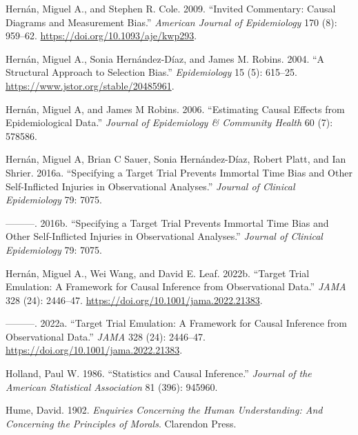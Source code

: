 \documentclass[
  singlecolumn]{article}
\newlength{\cslhangindent}
\newlength{\cslentryspacingunit} %
\newenvironment{CSLReferences}[2] %
 {%
  \setlength{\parindent}{0pt}
  \ifodd #1
  \let\oldpar\par
  \def\par{\hangindent=\cslhangindent\oldpar}
  \fi
  \setlength{\parskip}{#2\cslentryspacingunit}
 }%
 {}
\begin{document}
\begin{CSLReferences}{1}{0}
\leavevmode{}%
Hernán, Miguel A., and Stephen R. Cole. 2009. {``Invited Commentary:
Causal Diagrams and Measurement Bias.''} \emph{American Journal of
Epidemiology} 170 (8): 959--62.
\url{https://doi.org/10.1093/aje/kwp293}.

\leavevmode{}%
Hernán, Miguel A., Sonia Hernández-Díaz, and James M. Robins. 2004. {``A
Structural Approach to Selection Bias.''} \emph{Epidemiology} 15 (5):
615--25. \url{https://www.jstor.org/stable/20485961}.

\leavevmode{}%
Hernán, Miguel A, and James M Robins. 2006. {``Estimating Causal Effects
from Epidemiological Data.''} \emph{Journal of Epidemiology \& Community
Health} 60 (7): 578586.

\leavevmode{}%
Hernán, Miguel A, Brian C Sauer, Sonia Hernández-Díaz, Robert Platt, and
Ian Shrier. 2016a. {``Specifying a Target Trial Prevents Immortal Time
Bias and Other Self-Inflicted Injuries in Observational Analyses.''}
\emph{Journal of Clinical Epidemiology} 79: 7075.

\leavevmode{}%
---------. 2016b. {``Specifying a Target Trial Prevents Immortal Time
Bias and Other Self-Inflicted Injuries in Observational Analyses.''}
\emph{Journal of Clinical Epidemiology} 79: 7075.

\leavevmode{}%
Hernán, Miguel A., Wei Wang, and David E. Leaf. 2022b. {``Target Trial
Emulation: A Framework for Causal Inference from Observational Data.''}
\emph{JAMA} 328 (24): 2446--47.
\url{https://doi.org/10.1001/jama.2022.21383}.

\leavevmode{}%
---------. 2022a. {``Target Trial Emulation: A Framework for Causal
Inference from Observational Data.''} \emph{JAMA} 328 (24): 2446--47.
\url{https://doi.org/10.1001/jama.2022.21383}.

\leavevmode{}%
Holland, Paul W. 1986. {``Statistics and Causal Inference.''}
\emph{Journal of the American Statistical Association} 81 (396): 945960.

\leavevmode{}%
Hume, David. 1902. \emph{Enquiries Concerning the Human Understanding:
And Concerning the Principles of Morals}. Clarendon Press.


\end{CSLReferences}
\end{document}
